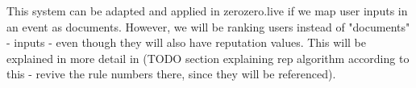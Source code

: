 \begin{enumerate}
    This system can be adapted and applied in zerozero.live if we map user inputs in an event as documents. However, we will be ranking users instead of "documents" - inputs - even though they will also have reputation values. This will be explained in more detail in (TODO section explaining rep algorithm according to this - revive the rule numbers there, since they will be referenced).
    
\end{enumerate} 